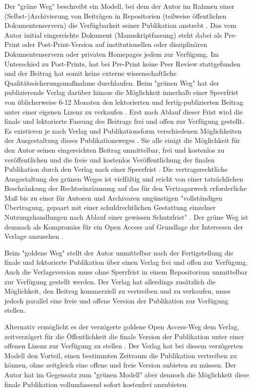 Der "grüne Weg" beschreibt ein Modell, bei dem der Autor im Rahmen einer (Selbst-)Archivierung von Beiträgen in Repositorien (teilweise öffentlichen Dokumentenservern) die Verfügbarkeit seiner Publikation anstrebt \cite{brembs2015open} \cite{muller_2010_open} \cite{grand_2012_open}. Das vom Autor initial eingereichte Dokument (Manuskriptfassung) steht dabei als Pre-Print oder Post-Print-Version auf institutionellen oder disziplinären Dokumentenservern \cite{suchen} oder privaten Homepages \cite{suchen} jedem zur Verfügung. Im Unterschied zu Post-Prints, hat bei Pre-Print keine Peer Review stattgefunden \cite{suchen} und der Beitrag hat somit keine externe wissenschaftliche Qualitätssicherungsmaßnahme durchlaufen. Beim "grünen Weg" hat der publizierende Verlag darüber hinaus die Möglichkeit innerhalb einer Speerfrist von üblicherweise 6-12 Monaten \cite{suchen} den lektorierten und fertig-publizierten Beitrag unter einer eigenen Lizenz zu verkaufen \cite{suchen}. Erst nach Ablauf dieser Frist wird die finale und lektorierte Fassung des Beitrags frei und offen zur Verfügung gestellt. Es existieren je nach Verlag und Publikationsform verschiedenen Möglichkeiten der Ausgestaltung dieses Publikationsweges \cite{suchen}. Sie alle einigt die Möglichkeit für den Autor seinen eingereichten Beitrag unmittelbar, frei und kostenlos zu veröffentlichen und die freie und kostenlos Veröffentlichung der finalen Publikation durch den Verlag nach einer Speerfrist \cite{dorschel_2006_open}. Die vertragsrechtliche Ausgestaltung des grünen Weges ist vielfältig und reicht von einer tatsächlichen Beschränkung der Rechtseinräumung auf das für den Vertragszweck erforderliche Maß bis zu einer für Autoren und Archivaren ungünstigen "vollständigen Übertragung, gepaart mit einer schuldrechtlichen Gestattung einzelner Nutzungshandlungen nach Ablauf einer gewissen Schutzfrist" \cite{dorschel_2006_open}. Der grüne Weg ist demnach als Kompromiss für ein Open Access auf Grundlage der Interessen der Verlage anzusehen \cite{Mussell_2013}.

Beim "goldene Weg" stellt der Autor unmittelbar nach der Fertigstellung die finale und lektorierte Publikation über einen Verlag frei und offen zur Verfügung. Auch die Verlagsversion muss ohne Sperrfrist in einem Repositorium unmittelbar zur Verfügung gestellt werden. Der Verlag hat allerdings zusätzlich die Möglichkeit, den Beitrag kommerziell zu vertreiben und zu verkaufen, muss jedoch parallel eine freie und offene Version der Publikation zur Verfügung stellen.

Alternativ ermöglicht es der verzögerte goldene Open Access-Weg dem Verlag, zeitverzögert für die Öffentlichkeit die finale Version der Publikation unter einer offenen Lizenz zur Verfügung zu stellen \cite{lewis_2012_inevitability}. Der Verlag hat bei diesem verzögerten Modell den Vorteil, einen bestimmten Zeitraum die Publikation vertreiben zu können, ohne zeitgleich eine offene und freie Version anbieten zu müssen. Der Autor hat im Gegensatz zum "grünen Modell" aber dennoch die Möglichkeit diese finale Publikation vollumfassend sofort kostenfrei anzubieten.

